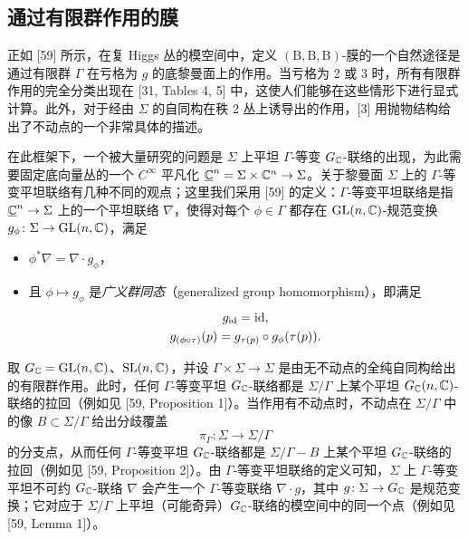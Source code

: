 \subsection{通过有限群作用的膜}

正如 [59] 所示，在复 Higgs 丛的模空间中，定义 $(\mathrm{B},\mathrm{B},\mathrm{B})$-膜的一个自然途径是通过有限群 $\Gamma$ 在亏格为 $g$ 的底黎曼面上的作用。当亏格为 2 或 3 时，所有有限群作用的完全分类出现在 [31, Tables 4, 5] 中，这使人们能够在这些情形下进行显式计算。此外，对于经由 $\Sigma$ 的自同构在秩 2 丛上诱导出的作用，[3] 用抛物结构给出了不动点的一个非常具体的描述。


在此框架下，一个被大量研究的问题是 $\Sigma$ 上平坦 $\Gamma$-等变 $G_{\mathbb{C}}$-联络的出现，为此需要固定底向量丛的一个 $C^\infty$ 平凡化 $\underline{\mathbb{C}}^n=\Sigma\times\mathbb{C}^n\to\Sigma$。关于黎曼面 $\Sigma$ 上的 $\Gamma$-等变平坦联络有几种不同的观点；这里我们采用 [59] 的定义：$\Gamma$-等变平坦联络是指 $\underline{\mathbb{C}}^n\to\Sigma$ 上的一个平坦联络 $\nabla$，使得对每个 $\phi\in\Gamma$ 都存在 $\mathrm{GL}(n,\mathbb{C})$-规范变换 $g_\phi\colon\Sigma\to\mathrm{GL}(n,\mathbb{C})$，满足
\begin{itemize}[leftmargin=1.4em,itemsep=1pt,topsep=1pt]
\item $\phi^*\nabla=\nabla\cdot g_\phi$，
\item 且 $\phi\mapsto g_\phi$ 是\textit{广义群同态}（generalized group homomorphism），即满足
\[
\begin{gathered}
g_{\mathrm{id}}=\mathrm{id},\\
g_{(\phi\circ\tau)}(p)=g_{\tau(p)}\circ g_\phi(\tau(p)).
\end{gathered}
\]
\end{itemize}


取 $G_{\mathbb{C}}=\mathrm{GL}(n,\mathbb{C})$、$\mathrm{SL}(n,\mathbb{C})$，并设 $\Gamma\times\Sigma\to\Sigma$ 是由无不动点的全纯自同构给出的有限群作用。此时，任何 $\Gamma$-等变平坦 $G_{\mathbb{C}}$-联络都是 $\Sigma/\Gamma$ 上某个平坦 $G_{\mathbb{C}}(n,\mathbb{C})$-联络的拉回（例如见 [59, Proposition 1]）。当作用有不动点时，不动点在 $\Sigma/\Gamma$ 中的像 $B\subset\Sigma/\Gamma$ 给出分歧覆盖
\[
\pi_\Gamma\colon\Sigma\to\Sigma/\Gamma
\]
的分支点，从而任何 $\Gamma$-等变平坦 $G_{\mathbb{C}}$-联络都是 $\Sigma/\Gamma-B$ 上某个平坦 $G_{\mathbb{C}}$-联络的拉回（例如见 [59, Proposition 2]）。由 $\Gamma$-等变平坦联络的定义可知，$\Sigma$ 上 $\Gamma$-等变平坦不可约 $G_{\mathbb{C}}$-联络 $\nabla$ 会产生一个 $\Gamma$-等变联络 $\nabla\cdot g$，其中 $g\colon\Sigma\to G_{\mathbb{C}}$ 是规范变换；它对应于 $\Sigma/\Gamma$ 上平坦（可能奇异）$G_{\mathbb{C}}$-联络的模空间中的同一个点（例如见 [59, Lemma 1]）。

